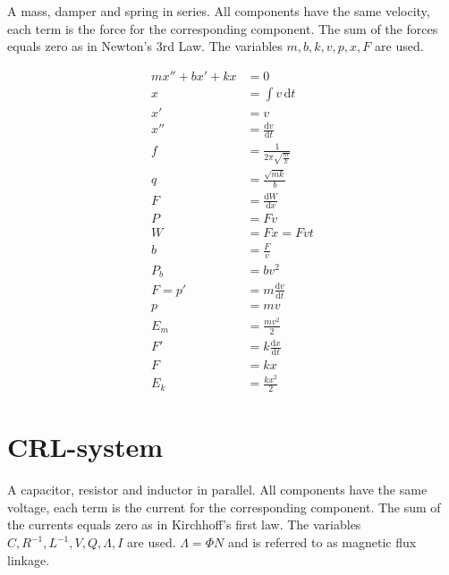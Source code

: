 \documentclass[]{../common/elementary-physics}
\begin{document}
A mass, damper and spring in series.
All components have the same velocity, each term is the force for the corresponding component.
The sum of the forces equals zero as in Newton's 3rd Law.
The variables $m,b,k,v,p,x,F$ are used.

\begin{subequations}
\begin{align}
m x'' + b x' + k x &= 0 \\
x &= \int v \, \mathrm{d}t \\
x' &= v \tag{definition of velocity} \\
x'' &= \frac{\mathrm{d}v}{\mathrm{d}t} \tag{definition of acceleration} \\
f &= \frac{1}{2 \pi \sqrt{\frac{m}{k}}} \tag{frequency} \\
q &= \frac{\sqrt{m k}}{b} \tag{quality factor}\\
F &= \frac{\mathrm{d}W}{\mathrm{d}x} \\
P &= F v \tag{power} \\
W &= F x = F v t \tag{work} \\
b &= \frac{F}{v} \tag{parasite} \\
P_b &= b v^2 \tag{losses} \\
F = p' &= m \frac{\mathrm{d}v}{\mathrm{d}t} \tag{Newton's 2nd law} \\
p &= m v \tag{definition of momentum} \\
E_m &= \frac{m v^2}{2} \tag{kinetic energy} \\
F' &= k \frac{\mathrm{d}x}{\mathrm{d}t} \\
F &= k x \tag{Hooke's law} \\
E_k &= \frac{k x^2}{2} \tag{energy in a spring} 
\end{align}
\end{subequations}

\pagebreak

\section{CRL-system}

A capacitor, resistor and inductor in parallel.
All components have the same voltage, each term is the current for the corresponding component.
The sum of the currents equals zero as in Kirchhoff's first law.
The variables $C,R^{-1},L^{-1},V,Q,\Lambda,I$ are used.
$\Lambda = \Phi N$ and is referred to as magnetic flux linkage.
\end{document}
